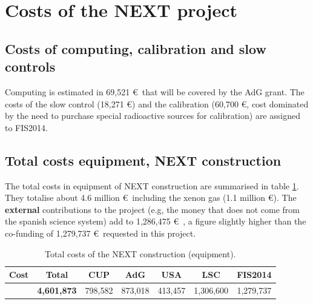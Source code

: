 \documentclass[a4paper,11pt,oneside]{article}
\begin{document}
\section{\bf Costs of the NEXT project}
\label{next.costs}





\subsection{Costs of computing, calibration and slow controls}
Computing is estimated in 69,521 \euro\ that will be covered by the AdG grant. The costs of the slow control (18,271 \euro) and the calibration (60,700 \euro, cost dominated by the need to purchase special radioactive sources for calibration) are assigned to FIS2014. 

\subsection{Total costs equipment, NEXT construction}
The total costs in equipment of NEXT construction are summarised in table  \ref{tab.TotalE}. They totalise about 4.6 million \euro\ including the xenon gas (1.1 million \euro). The {\bf external} contributions to the project (e.g, the money that does not come from the spanish science system)
add to 1,286,475 \euro\ ,  a figure slightly higher than the co-funding of 1,279,737  \euro\ 
requested in this project. 

\begin{table}[h!]
\begin{center}
\begin{tabular}{|l|c|c|c|c|c|c|}
\hline
Cost	& Total &	CUP &	AdG	& USA &	LSC &	FIS2014 \\
 \hline
& {\bf 4,601,873} &	798,582 & 	873,018 & 	413,457&	1,306,600 & 1,279,737 \\	
 \hline\hline
\end{tabular}  
\caption{Total costs of the NEXT construction (equipment).}
\label{tab.TotalE}
\end{center}
\end{table} 



\end{document}
